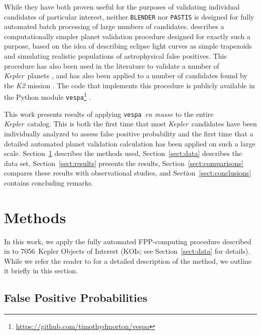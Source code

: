 \documentclass{emulateapj}
\newcommand{\sectionname}{Section}
\newcommand{\Sect}[1]{\sectionname~\ref{sect:#1}}
\newcommand{\sect}[1]{\Sect{#1}}
\newcommand{\sectlabel}[1]{\label{sect:#1}}
\newcommand{\ncalc}{7056}
\newcommand{\kepler}{\textit{Kepler}}
\newcommand{\vespa}{\texttt{vespa}}
\begin{document}
While they have both proven useful for the purposes of validating
individual candidates of particular interest, neither \verb|BLENDER|
nor \verb|PASTIS| is designed for fully automated batch processing of
large numbers of candidates.  \citet{Morton:2012} describes a
computationally simpler planet validation procedure designed for
exactly such a purpose, based on the idea of describing eclipse light
curves as simple trapezoids and simulating realistic populations of
astrophysical false positives. This procedure has also been used in
the literature to validate a number of \kepler\ planets
\citep[e.g.,][]{Muirhead:2012,Dawson:2012,Swift:2013}, and has also
been applied to a number of candidates found by the \textit{K2}
mission \citep{Montet:2015,Becker:2015}.  The code that implements
this procedure is publicly available in the Python module
\vespa\footnote{\url{https://github.com/timothydmorton/vespa}}
\citep{vespa}.

This work presents results of applying \vespa\ \emph{en masse} to the
entire \kepler\ catalog. This is both the first time that most
\kepler\ candidates have been individually analyzed to assess false
positive probability and the first time that a detailed automated
planet validation calculation has been applied on such a large scale.
\Sect{methods} describes the methods used, \sect{data} describes the data set,
\sect{results} presents the results, \sect{comparisons} compares these
results with observational studies, and \sect{conclusions} contains concluding
remarks.



\section{Methods}
\sectlabel{methods}

In this work, we apply the fully automated FPP-computing procedure
described in \citet[][hereafter ]{Morton:2012}
to \ncalc\ Kepler Objects of Interest (KOIs; see \sect{data} for
details).  While we refer the reader to  for a
detailed description of the method, we outline it briefly in this
section.  


\subsection{False Positive Probabilities}
\sectlabel{methods:fpp}
\end{document}

